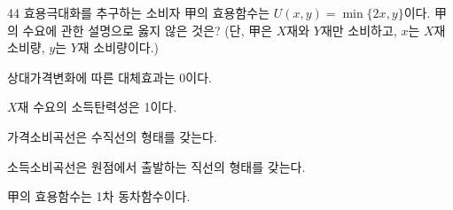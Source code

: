 \begin{question}{44}
효용극대화를 추구하는 소비자 甲의 효용함수는 $U(x , y)=\min\{2x , y\}$이다. 甲의 수요에 관한 설명으로 옳지 않은 것은? (단, 甲은 $X$재와 $Y$재만 소비하고, $x$는 $X$재 소비량, $y$는 $Y$재 소비량이다.)
\begin{choices}
  \item 상대가격변화에 따른 대체효과는 0이다.
  \item $X$재 수요의 소득탄력성은 1이다.
  \item 가격소비곡선은 수직선의 형태를 갖는다.
  \item 소득소비곡선은 원점에서 출발하는 직선의 형태를 갖는다.
  \item 甲의 효용함수는 1차 동차함수이다.
\end{choices}
\end{question}
